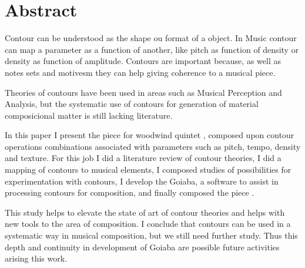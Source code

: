 \chapter*{Abstract}
\label{cha:abstract}

Contour can be understood as the shape ou format of a object. In Music
contour can map a parameter as a function of another, like pitch as
function of density or density as function of amplitude. Contours are
important because, as well as notes sets and motivesm they can help
giving coherence to a musical piece.

Theories of contours have been used in areas such as Musical
Perception and Analysis, but the systematic use of contours for
generation of material composicional matter is still lacking
literature.

In this paper I present the piece for woodwind quintet \obra{},
composed upon contour operations combinations associated with
parameters such as pitch, tempo, density and texture. For this job I
did a literature review of contour theories, I did a mapping of
contours to musical elements, I composed studies of possibilities for
experimentation with contours, I develop the Goiaba, a software to
assist in processing contours for composition, and finally composed
the piece \obra{}.

This study helps to elevate the state of art of contour theories and
helps with new tools to the area of composition.
I conclude that contours can be used in a systematic way in musical
composition, but we still need further study. Thus this depth and
continuity in development of Goiaba are possible future activities
arising this work.
